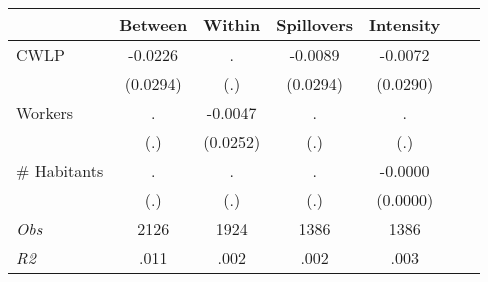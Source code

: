 \begin{tabular}{l*{6}{c}}\hline&\multicolumn{1}{c}{Between}&\multicolumn{1}{c}{Within}&\multicolumn{1}{c}{Spillovers}&\multicolumn{1}{c}{Intensity}\\ \hline 
CWLP & -0.0226 & . & -0.0089 & -0.0072 \\
 & (0.0294) & (.) & (0.0294) & (0.0290) \\
Workers & . & -0.0047 & . & . \\
 & (.) & (0.0252) & (.) & (.) \\
\# Habitants & . & . & . & -0.0000 \\
  & (.) & (.) & (.) & (0.0000) \\
\hline \textit{Obs} & 2126 & 1924 & 1386 & 1386  \\ \textit{R2} & .011 & .002 & .002 & .003 \\ \hline \end{tabular}
